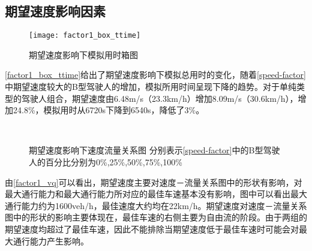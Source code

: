 \subsection{期望速度影响因素}

\begin{figure}[H]
\begin{center}
\texttt{[image: factor1\_box\_ttime]}
\caption{期望速度影响下模拟用时箱图}
\label{factor1_box_ttime}
\end{center}
\end{figure}

\autoref{factor1_box_ttime}给出了期望速度影响下模拟总用时的变化，随着\autoref{speed-factor}中期望速度较大的B型驾驶人的增加，模拟所用时间呈现下降的趋势。对于单纯类型的驾驶人组合，期望速度由6.48m/s（23.3km/h）增加8.09m/s（30.6km/h），增加24.8\%，模拟用时从6720s下降到6540s，降低了3\%。


\begin{figure}[H]%
\centering
{}%
\\%
%
\caption[A set of four sub-floats.]{期望速度影响下速度流量关系图
分别表示\autoref{speed-factor}中的B型驾驶人的百分比分别为0\%,25\%,50\%,75\%,100\%}%
\label{factor1_vq}%
\end{figure}

由\autoref{factor1_vq}可以看出，期望速度主要对速度－流量关系图中的形状有影响，对最大通行能力和最大通行能力所对应的最佳车速基本没有影响，图中可以看出最大通行能力约为1600veh/h，最佳速度大约均在22km/h。期望速度对速度－流量关系图中的形状的影响主要体现在，最佳车速的右侧主要为自由流的阶段。由于两组的期望速度均超过了最佳车速，因此不能排除当期望速度低于最佳车速时可能会对最大通行能力产生影响。



